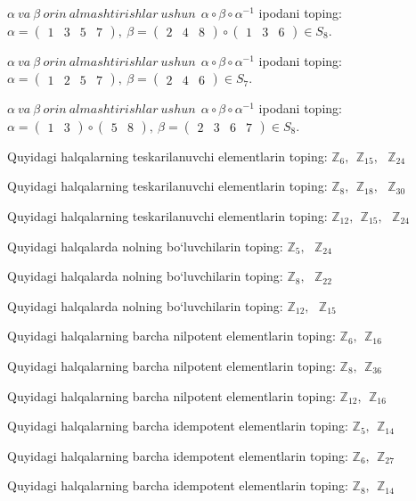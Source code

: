 \(\alpha\ va\ \beta\ orin\ almashtirishlar\ ushun\ \ \alpha \circ \beta \circ \alpha^{- 1}\) ipodani toping:\(\alpha = \begin{pmatrix}
1 & 3 & 5 & 7
\end{pmatrix},\ \beta = \begin{pmatrix}
2 & 4 & 8
\end{pmatrix} \circ \begin{pmatrix}
1 & 3 & 6
\end{pmatrix} \in S_{8}\).

\(\alpha\ va\ \beta\ orin\ almashtirishlar\ ushun\ \ \alpha \circ \beta \circ \alpha^{- 1}\) ipodani toping:\(\alpha = \begin{pmatrix}
1 & 2 & 5 & 7
\end{pmatrix},\ \beta = \begin{pmatrix}
2 & 4 & 6
\end{pmatrix} \in S_{7}\).

\(\alpha\ va\ \beta\ orin\ almashtirishlar\ ushun\ \ \alpha \circ \beta \circ \alpha^{- 1}\) ipodani toping:\(\alpha = \begin{pmatrix}
1 & 3
\end{pmatrix} \circ \begin{pmatrix}
5 & 8
\end{pmatrix},\ \beta = \begin{pmatrix}
2 & 3 & 6 & 7
\end{pmatrix} \in S_{8}\).

Quyidagi halqalarning teskarilanuvchi elementlarin toping: \(\mathbb{Z}_{6},\ \ \mathbb{Z}_{15},\ \ \ \mathbb{Z}_{24}\)

Quyidagi halqalarning teskarilanuvchi elementlarin toping: \(\mathbb{Z}_{8},\ \ \mathbb{Z}_{18},\ \ \ \mathbb{Z}_{30}\)

Quyidagi halqalarning teskarilanuvchi elementlarin toping: \(\mathbb{Z}_{12},\ \ \mathbb{Z}_{15},\ \ \ \mathbb{Z}_{24}\)

Quyidagi halqalarda nolning bo`luvchilarin toping: \(\mathbb{Z}_{5},\ \ \ \mathbb{Z}_{24}\)

Quyidagi halqalarda nolning bo`luvchilarin toping: \(\mathbb{Z}_{8},\ \ \ \mathbb{Z}_{22}\)

Quyidagi halqalarda nolning bo`luvchilarin toping: \(\mathbb{Z}_{12},\ \ \ \mathbb{Z}_{15}\)

Quyidagi halqalarning barcha nilpotent elementlarin toping: \(\mathbb{Z}_{6},\ \ \mathbb{Z}_{16}\)

Quyidagi halqalarning barcha nilpotent elementlarin toping: \(\mathbb{Z}_{8},\ \ \mathbb{Z}_{36}\)

Quyidagi halqalarning barcha nilpotent elementlarin toping: \(\mathbb{Z}_{12},\ \ \mathbb{Z}_{16}\)

Quyidagi halqalarning barcha idempotent elementlarin toping: \(\mathbb{Z}_{5},\ \ \mathbb{Z}_{14}\)

Quyidagi halqalarning barcha idempotent elementlarin toping: \(\mathbb{Z}_{6},\ \ \mathbb{Z}_{27}\)

Quyidagi halqalarning barcha idempotent elementlarin toping: \(\mathbb{Z}_{8},\ \ \mathbb{Z}_{14}\)